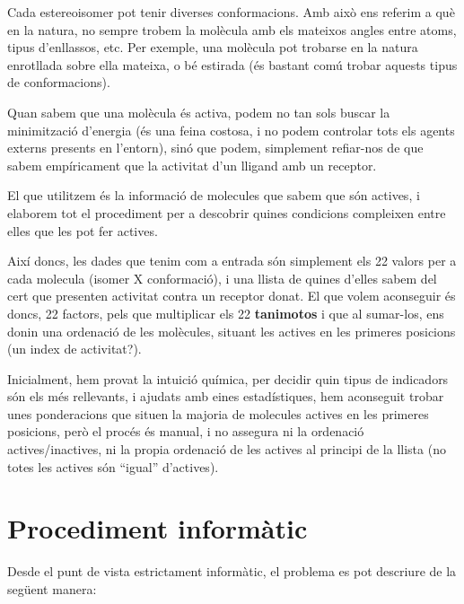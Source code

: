 \documentclass[titlepage,a4paper,12pt]{book}
\begin{document}
Cada estereoisomer pot tenir diverses conformacions.  Amb això ens referim a què
en la natura, no sempre trobem la molècula amb els mateixos angles entre atoms,
tipus d'enllassos, etc. Per exemple, una molècula pot trobarse en la natura
enrotllada sobre ella mateixa, o bé estirada (és bastant comú trobar aquests
tipus de conformacions).


Quan sabem que una molècula és activa, podem no tan sols buscar la minimització
d'energia (és una feina costosa, i no podem controlar tots els agents externs
presents en l'entorn), sinó que podem, simplement refiar-nos de que sabem
empíricament que la activitat d'un lligand amb un receptor.



El que utilitzem és la informació de molecules que sabem que són actives,
i elaborem tot el procediment per a descobrir quines condicions compleixen entre
elles que les pot fer actives.

Així doncs, les dades que tenim com a entrada són simplement els 22 valors per a
cada molecula (isomer X conformació), i una llista de quines d'elles sabem del
cert que presenten activitat contra un receptor donat.  El que volem aconseguir
és doncs, 22 factors, pels que multiplicar els 22 \textbf{tanimotos} i que al
sumar-los, ens donin una ordenació de les molècules, situant les actives en
les primeres posicions (un index de activitat?).


Inicialment, hem provat la intuició química, per decidir quin tipus de
indicadors són els més rellevants, i ajudats amb eines estadístiques, hem
aconseguit trobar unes ponderacions que situen la majoria de molecules actives
en les primeres posicions, però el procés és manual, i no assegura ni la
ordenació actives/inactives, ni la propia ordenació de les actives al principi
de la llista (no totes les actives són ``igual'' d'actives).

\section{Procediment informàtic} %
\label{sec:Procediment informatic}

Desde el punt de vista estrictament informàtic, el problema es pot descriure de
la següent manera:
\end{document}
